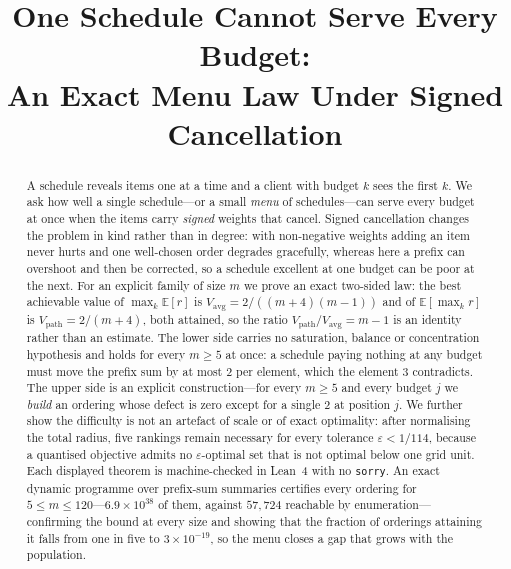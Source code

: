 \documentclass[conference]{IEEEtran}
\theoremstyle{definition}
\begin{document}
\title{One Schedule Cannot Serve Every Budget:\\
An Exact Menu Law Under Signed Cancellation}

\author{
}

\maketitle

\begin{abstract}
A schedule reveals items one at a time and a client with budget $k$ sees the first $k$. We
ask how well a single schedule---or a small \emph{menu} of schedules---can serve every budget
at once when the items carry \emph{signed} weights that cancel. Signed cancellation changes
the problem in kind rather than in degree: with non-negative weights adding an item never
hurts and one well-chosen order degrades gracefully, whereas here a prefix can overshoot and
then be corrected, so a schedule excellent at one budget can be poor at the next. For an
explicit family of size $m$ we prove an exact two-sided law: the best achievable value of
$\max_{k}\mathbb{E}[r]$ is $V_{\mathrm{avg}}=2/((m+4)(m-1))$ and of
$\mathbb{E}[\max_{k}r]$ is $V_{\mathrm{path}}=2/(m+4)$, both attained, so the ratio
$V_{\mathrm{path}}/V_{\mathrm{avg}}=m-1$ is an identity rather than an estimate. The lower
side carries no saturation, balance or concentration hypothesis and holds for every $m\ge5$
at once: a schedule paying nothing at any budget must move the prefix sum by at most $2$ per
element, which the element $3$ contradicts. The upper side is an explicit construction---for
every $m\ge5$ and every budget $j$ we \emph{build} an ordering whose defect is zero except
for a single $2$ at position $j$. We further show the difficulty is not an artefact of
scale or of exact optimality: after normalising the total radius, five rankings remain
necessary for every tolerance $\varepsilon<1/114$, because a quantised objective admits no
$\varepsilon$-optimal set that is not optimal below one grid unit. Each displayed theorem is
machine-checked in Lean~4 with no \texttt{sorry}. An exact dynamic programme over
prefix-sum summaries certifies every ordering for $5\le m\le120$---$6.9\times10^{38}$ of
them, against $57{,}724$ reachable by enumeration---confirming the bound at every size and
showing that the fraction of orderings attaining it falls from one in five to
$3\times10^{-19}$, so the menu closes a gap that grows with the population.
\end{abstract}
\end{document}
